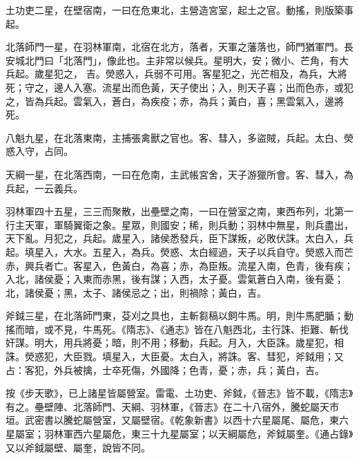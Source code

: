 \begin{pinyinscope}
 土功吏二星，在壁宿南，一曰在危東北，主營造宮室，起土之官。動搖，則版築事起。



 北落師門一星，在羽林軍南，北宿在北方，落者，天軍之藩落也，師門猶軍門。長安城北門曰「北落門」，像此也。主非常以候兵。星明大，安；微小、芒角，有大兵起。歲星犯之，
 吉。熒惑入，兵弱不可用。客星犯之，光芒相及，為兵，大將死；守之，邊人入塞。流星出而色黃，天子使出；入，則天子喜；出而色赤，或犯之，皆為兵起。雲氣入，蒼白，為疾疫；赤，為兵；黃白，喜；黑雲氣入，邊將死。



 八魁九星，在北落東南，主捕張禽獸之官也。客、彗入，多盜賊，兵起。太白、熒惑入守，占同。



 天綱一星，在北落西南，一曰在危南，主武帳宮舍，天子游獵所會。客、彗入，為兵起，一云義兵。



 羽林軍四十五星，三三而聚散，出壘壁之南，一曰在營室之南，東西布列，北第一行主天軍，軍騎翼衛之象。星眾，則國安；稀，則兵動；羽林中無星，則兵盡出，天下亂。月犯之，兵起。歲星入，諸侯悉發兵，臣下謀叛，必敗伏誅。太白入，兵起。填星入，大水。五星入，為兵。熒惑、太白經過，天子以兵自守。熒惑入而芒赤，興兵者亡。客星入，色黃白，為喜；赤，為臣叛。流星入南，色青，後有疾；入北，諸侯憂；入東而赤黑，後有謀；入西，太子憂。雲氣蒼白入南，後有憂；
 北，諸侯憂；黑，太子、諸侯忌之；出，則禍除；黃白，吉。



 斧鉞三星，在北落師門東，芟刈之具也，主斬芻稿以飼牛馬。明，則牛馬肥腯；動搖而暗，或不見，牛馬死。《隋志》、《通志》皆在八魁西北，主行誅、拒難、斬伐奸謀。明大，用兵將憂；暗，則不用；移動，兵起。月入，大臣誅。歲星犯，相誅。熒惑犯，大臣戮。填星入，大臣憂。太白入，將誅。客、彗犯，斧鉞用；又占：客犯，外兵被擒，士卒死傷，外國降；色青，憂；赤，兵；黃白，吉。



 按《步天歌》，已上諸星皆屬營室。雷電、土功吏、斧鉞，《晉志》皆不載，《隋志》有之。壘壁陣、北落師門、天綱、羽林軍，《晉志》在二十八宿外，騰蛇屬天市垣。武密書以騰蛇屬營室，又屬壁宿。《乾象新書》以西十六星屬尾、屬危，東六星屬室；羽林軍西六星屬危，東三十九星屬室；以天綱屬危，斧鉞屬奎。《通占錄》又以斧鉞屬壁、屬奎，說皆不同。




\end{pinyinscope}
